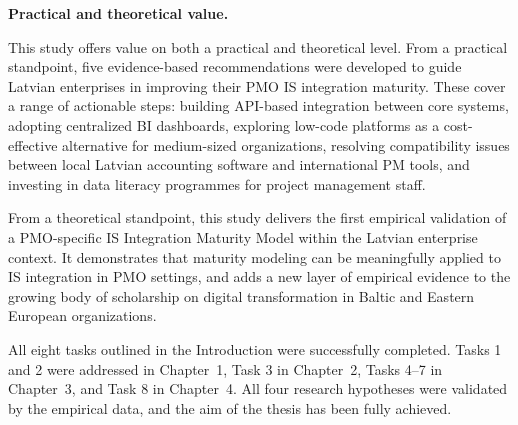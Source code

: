 \textbf{Practical and theoretical value.}

This study offers value on both a practical and theoretical level.
From a practical standpoint, five evidence-based recommendations
were developed to guide Latvian enterprises in improving their
PMO IS integration maturity. These cover a range of actionable
steps: building API-based integration between core systems,
adopting centralized BI dashboards, exploring low-code platforms
as a cost-effective alternative for medium-sized organizations,
resolving compatibility issues between local Latvian accounting
software and international PM tools, and investing in data
literacy programmes for project management staff.

From a theoretical standpoint, this study delivers the first
empirical validation of a PMO-specific IS Integration Maturity
Model within the Latvian enterprise context. It demonstrates
that maturity modeling can be meaningfully applied to IS
integration in PMO settings, and adds a new layer of empirical
evidence to the growing body of scholarship on digital
transformation in Baltic and Eastern European organizations.

All eight tasks outlined in the Introduction were successfully
completed. Tasks 1 and 2 were addressed in Chapter~1, Task 3
in Chapter~2, Tasks 4--7 in Chapter~3, and Task 8 in Chapter~4.
All four research hypotheses were validated by the empirical
data, and the aim of the thesis has been fully achieved.
